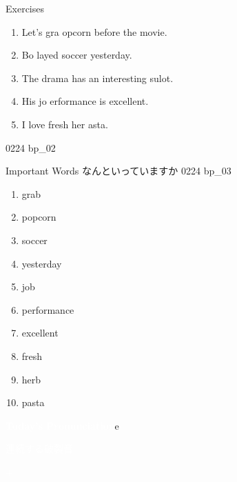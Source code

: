 \documentclass[aspectratio=169,xcolor={dvipsnames,table}]{beamer}
\begin{document}
\begin{frame}[plain]{Exercises }
  \Large
  \begin{enumerate}
    \item<2-> Let's gra  opcorn before the movie.
    \item<4-> Bo  layed soccer yesterday.
    \item<6-> The drama has an interesting sulot.
    \item<8-> His jo  erformance is excellent.
    \item<10-> I love fresh her  asta.
  \end{enumerate}

  \hfill{\tiny 0224}\,{\scriptsize {}\,bp\_02}

\end{frame}
\begin{frame}[plain,t]{Important Words}
  なんといっていますか%
  \hfill{\tiny 0224}\,{\scriptsize {}\,bp\_03}\pause
  \vspace{-8pt}
  \Large
  \begin{enumerate}[<+- |alert@+>]\setlength{\itemsep}{-1.8pt}
    \item grab%
    \item popcorn
    \item soccer
    \item yesterday
    \item job
    \item performance
    \item excellent
    \item fresh
    \item herb
    \item pasta%

  \end{enumerate}
\end{frame}
\begin{frame}
  \centering
  \textcolor{white}{\Huge\bfseries Today's Pronunciation}e

  \vspace{30pt}

  \textcolor{white}{\Large 連続する破裂音}

  \textcolor{white}{\Large {} $+$ }

\end{frame}
\end{document}
